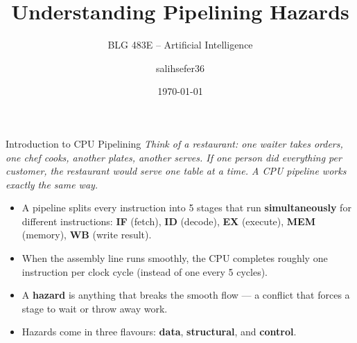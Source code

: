 \documentclass{beamer}
\title{Understanding Pipelining Hazards}
\subtitle{BLG 483E -- Artificial Intelligence}
\author{salihsefer36}
\date{\today}
\begin{document}
\begin{frame}
  \titlepage
\end{frame}

\begin{frame}{Introduction to CPU Pipelining}
  \textit{Think of a restaurant: one waiter takes orders, one chef cooks,
  another plates, another serves. If one person did everything per customer,
  the restaurant would serve one table at a time. A CPU pipeline works
  exactly the same way.}

  \medskip
  \begin{itemize}
    \item A pipeline splits every instruction into 5 stages that run
          \textbf{simultaneously} for different instructions:
          \textbf{IF} (fetch), \textbf{ID} (decode), \textbf{EX} (execute),
          \textbf{MEM} (memory), \textbf{WB} (write result).
    \item When the assembly line runs smoothly, the CPU completes roughly
          one instruction per clock cycle (instead of one every 5 cycles).
    \item A \textbf{hazard} is anything that breaks the smooth flow ---
          a conflict that forces a stage to wait or throw away work.
    \item Hazards come in three flavours: \textbf{data}, \textbf{structural},
          and \textbf{control}.
  \end{itemize}
\end{frame}
\end{document}
